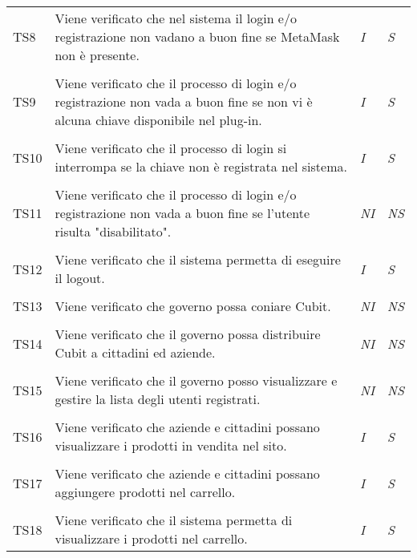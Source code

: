 \begin{longtable}{ >{\centering}p{} >{}p{}
			>{\centering}p{} >{\centering}p{}}
		\tabularnewline
		\hypertarget{TS8}{TS8} & Viene verificato che nel sistema il login e/o 
		registrazione non vadano a buon fine se MetaMask non è presente. & 
		\textit{I} & \textit{S}\\  

		\tabularnewline
		\hypertarget{TS9}{TS9} & Viene verificato che il processo di login e/o 
		registrazione non vada a buon fine se non vi è alcuna chiave disponibile nel 
		plug-in. & \textit{I} & \textit{S}\\ 

		\tabularnewline
		\hypertarget{TS10}{TS10} & Viene verificato che il processo di login si 
		interrompa se la chiave non è registrata nel sistema. & 
		\textit{I} & \textit{S}\\  

		\tabularnewline
		\hypertarget{TS11}{TS11} & Viene verificato che il processo di login e/o 
		registrazione non vada a buon fine se l'utente risulta "disabilitato". & 
		\textit{NI} & \textit{NS}\\ 

		\tabularnewline
		\hypertarget{TS12}{TS12} & Viene verificato che il sistema permetta di 
		eseguire il logout. & \textit{I} & \textit{S}\\ 

		\tabularnewline
		\hypertarget{TS13}{TS13} & Viene verificato che governo possa coniare Cubit. & 
		\textit{NI} & \textit{NS}\\ 

		\tabularnewline
		\hypertarget{TS14}{TS14} & Viene verificato che il governo possa distribuire 
		Cubit a cittadini ed aziende. & \textit{NI} & \textit{NS}\\ 

		\tabularnewline
		\hypertarget{TS15}{TS15} & Viene verificato che il governo posso visualizzare 
		e gestire la lista degli utenti registrati. & \textit{NI} & \textit{NS}\\ 

		\tabularnewline
		\hypertarget{TS16}{TS16} & Viene verificato che aziende e cittadini possano 
		visualizzare i prodotti in vendita nel sito. & \textit{I} & 
		\textit{S}\\ 

		\tabularnewline
		\hypertarget{TS17}{TS17} & Viene verificato che aziende e cittadini possano 
		aggiungere prodotti nel carrello. & \textit{I} & \textit{S}\\ 

		\tabularnewline
		\hypertarget{TS18}{TS18} & Viene verificato che il sistema permetta di 
		visualizzare i prodotti nel carrello. & \textit{I} & \textit{S}\\ 


\end{longtable}
